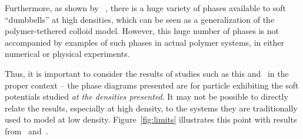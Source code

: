 {Furthermore, as shown by \citeauthor{saric2}~\cite{saric2}, there is a huge variety of phases available to soft ``dumbbells'' at high densities, which can be seen as a generalization of the polymer-tethered colloid model.
However, this huge number of phases is not accompanied by examples of such phases in actual polymer systems, in either numerical or physical experiments.

Thus, it is important to consider the results of studies such as this and~\cite{saric2} in the proper context -- the phase diagrams presented are for particle exhibiting the soft potentials studied \textit{at the densities presented}.
It may not be possible to directly relate the results, especially at high density, to the systems they are traditionally used to model at low density.
Figure~\ref{fig:limits} illustrates this point with results from~\cite{bozorgui} and~\cite{saric2}.

\begin{figure}
	\begin{center}


\end{center}
\end{figure}}
